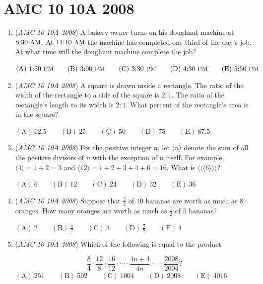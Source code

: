 \section{AMC 10 10A 2008}
        \begin{enumerate}
        	\item (\textit{AMC 10 10A 2008}) A bakery owner turns on his doughnut machine at $\text{8:30}\ {\small\text{AM}}$. At $\text{11:10}\ {\small\text{AM}}$ the machine has completed one third of the day's job. At what time will the doughnut machine complete the job?


 $\mathrm{(A)}\ \text{1:50}\ {\small\text{PM}}\qquad\mathrm{(B)}\ \text{3:00}\ {\small\text{PM}}\qquad\mathrm{(C)}\ \text{3:30}\ {\small\text{PM}}\qquad\mathrm{(D)}\ \text{4:30}\ {\small\text{PM}}\qquad\mathrm{(E)}\ \text{5:50}\ {\small\text{PM}}$


	\item (\textit{AMC 10 10A 2008}) A square is drawn inside a rectangle. The ratio of the width of the rectangle to a side of the square is $2:1$. The ratio of the rectangle's length to its width is $2:1$. What percent of the rectangle's area is in the square?


 $\mathrm{(A)}\ 12.5\qquad\mathrm{(B)}\ 25\qquad\mathrm{(C)}\ 50\qquad\mathrm{(D)}\ 75\qquad\mathrm{(E)}\ 87.5$


	\item (\textit{AMC 10 10A 2008}) For the positive integer $n$, let $\langle n\rangle$ denote the sum of all the positive divisors of $n$ with the exception of $n$ itself. For example, $\langle 4\rangle=1+2=3$ and $\langle 12 \rangle =1+2+3+4+6=16$. What is $\langle\langle\langle 6\rangle\rangle\rangle$?


 $\mathrm{(A)}\ 6\qquad\mathrm{(B)}\ 12\qquad\mathrm{(C)}\ 24\qquad\mathrm{(D)}\ 32\qquad\mathrm{(E)}\ 36$


	\item (\textit{AMC 10 10A 2008}) Suppose that $\frac{2}{3}$ of $10$ bananas are worth as much as $8$ oranges. How many oranges are worth as much as $\frac{1}{2}$ of $5$ bananas?


 $\mathrm{(A)}\ 2\qquad\mathrm{(B)}\ \frac{5}{2}\qquad\mathrm{(C)}\ 3\qquad\mathrm{(D)}\ \frac{7}{2}\qquad\mathrm{(E)}\ 4$


	\item (\textit{AMC 10 10A 2008}) Which of the following is equal to the product

 \[\frac{8}{4}\cdot\frac{12}{8}\cdot\frac{16}{12}\cdot\cdots\cdot\frac{4n+4}{4n}\cdot\cdots\cdot\frac{2008}{2004}?\]
$\mathrm{(A)}\ 251\qquad\mathrm{(B)}\ 502\qquad\mathrm{(C)}\ 1004\qquad\mathrm{(D)}\ 2008\qquad\mathrm{(E)}\ 4016$



\end{enumerate}
